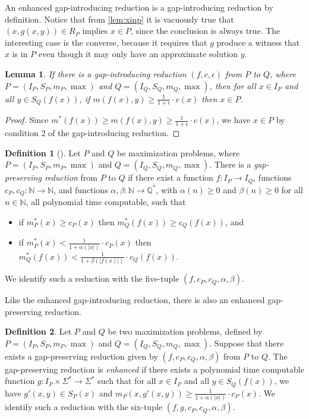 \documentclass[]{article}
\theoremstyle{plain}
\newtheorem{lemma}{Lemma}
\theoremstyle{definition}
\newtheorem{definition}{Definition}
\begin{document}
An enhanced gap-introducing reduction is a gap-introducing reduction by definition.
Notice that from \autoref{lem:xinp} it is vacuously true that $\left(x, g(x, y)\right) \in R_P$ implies $x \in P$, since the conclusion is always true.
The interesting case is the converse, because it requires that $g$ produce a witness that $x$ is in $P$ even though it may only have an approximate solution $y$.

\begin{lemma}\label{lem:xinp}
  If there is a gap-introducing reduction $(f, c, \epsilon)$ from $P$ to $Q$, where $P = (I_P, S_P, m_P, \max)$ and $Q = (I_Q, S_Q, m_Q, \max)$, then for all $x \in I_P$ and all $y \in S_Q(f(x))$, if $m(f(x), y) \geq \frac{1}{1 + \epsilon} \cdot c(x)$ then $x \in P$.
\end{lemma}
\begin{proof}
  Since $m^*(f(x)) \geq m(f(x), y) \geq \frac{1}{1 + \epsilon} \cdot c(x)$, we have $x \in P$ by condition 2 of the gap-introducing reduction.
\end{proof}

\begin{definition}[{\cite[Section~29.1]{vazirani}}]
  Let $P$ and $Q$ be maximization problems, where $P = (I_P, S_P, m_P, \max)$ and $Q = (I_Q, S_Q, m_Q, \max)$.
  There is a \emph{gap-preserving reduction} from $P$ to $Q$ if there exist a function $f \colon I_P \to I_Q$, functions $c_P, c_Q \colon \mathbb{N} \to \mathbb{N}$, and functions $\alpha, \beta \colon \mathbb{N} \to \mathbb{Q}^*$, with $\alpha(n) \geq 0$ and $\beta(n) \geq 0$ for all $n \in \mathbb{N}$, all polynomial time computable, such that
  \begin{itemize}
  \item if $m^*_P(x) \geq c_P(x)$ then $m^*_Q(f(x)) \geq c_Q(f(x))$, and
  \item if $m^*_P(x) < \frac{1}{1 + \alpha(|x|)} \cdot c_P(x)$ then $m^*_Q(f(x)) < \frac{1}{1 + \beta(|f(x)|)} \cdot c_Q(f(x))$.
  \end{itemize}
  We identify such a reduction with the five-tuple $(f, c_P, c_Q, \alpha, \beta)$.
\end{definition}

Like the enhanced gap-introducing reduction, there is also an enhanced gap-preserving reduction.

\begin{definition}
  Let $P$ and $Q$ be two maximization problems, defined by $P = (I_P, S_P, m_P, \max)$ and $Q = (I_Q, S_Q, m_Q, \max)$.
  Suppose that there exists a gap-preserving reduction given by $(f, c_P, c_Q, \alpha, \beta)$ from $P$ to $Q$.
  The gap-preserving reduction is \emph{enhanced} if there exists a polynomial time computable function $g \colon I_P \times \Sigma^* \to \Sigma^*$ such that for all $x \in I_P$ and all $y \in S_Q(f(x))$, we have $g'(x, y) \in S_P(x)$ and $m_P(x, g'(x, y)) \geq \frac{1}{1 + \alpha(|x|)} \cdot c_P(x)$.
  We identify such a reduction with the six-tuple $(f, g, c_P, c_Q, \alpha, \beta)$.
\end{definition}
\end{document}
